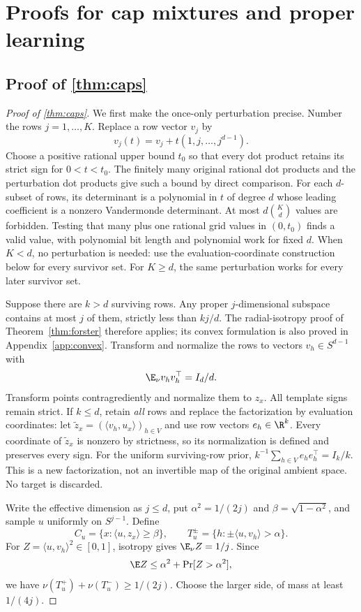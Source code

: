 \section{Proofs for cap mixtures and proper learning}\label{app:proofs-B}

\subsection[Proof of result caps]{Proof of \cref{thm:caps}}\label{proof:caps}
\begin{proof}[Proof of \cref{thm:caps}]
We first make the once-only perturbation precise. Number the rows $j=1,\ldots,K$. Replace a row vector $v_j$ by
\[
 v_j(t)=v_j+t(1,j,\ldots,j^{d-1}).
\]
Choose a positive rational upper bound $t_0$ so that every dot product retains its strict sign for $0<t<t_0$. The finitely many original rational dot products and the perturbation dot products give such a bound by direct comparison. For each $d$-subset of rows, its determinant is a polynomial in $t$ of degree $d$ whose leading coefficient is a nonzero Vandermonde determinant. At most $d\binom Kd$ values are forbidden. Testing that many plus one rational grid values in $(0,t_0)$ finds a valid value, with polynomial bit length and polynomial work for fixed $d$. When $K<d$, no perturbation is needed: use the evaluation-coordinate construction below for every survivor set. For $K\ge d$, the same perturbation works for every later survivor set.

Suppose there are $k>d$ surviving rows. Any proper $j$-dimensional subspace contains at most $j$ of them, strictly less than $kj/d$. The radial-isotropy proof of Theorem~\ref{thm:forster} therefore applies; its convex formulation is also proved in Appendix~\ref{app:convex}. Transform and normalize the rows to vectors $v_h\in S^{d-1}$ with
\[
 \E_\nu v_hv_h^\top=I_d/d.
\]
Transform points contragrediently and normalize them to $z_x$. All template signs remain strict. If $k\le d$, retain \emph{all} rows and replace the factorization by evaluation coordinates: let $\widetilde z_x=(\langle v_h,u_x\rangle)_{h\in V}$ and use row vectors $e_h\in\R^k$. Every coordinate of $\widetilde z_x$ is nonzero by strictness, so its normalization is defined and preserves every sign. For the uniform surviving-row prior, $k^{-1}\sum_{h\in V}e_he_h^\top=I_k/k$. This is a new factorization, not an invertible map of the original ambient space. No target is discarded.

Write the effective dimension as $j\le d$, put $\alpha^2=1/(2j)$ and $\beta=\sqrt{1-\alpha^2}$, and sample $u$ uniformly on $S^{j-1}$. Define
\[
 C_u=\{x:\langle u,z_x\rangle\ge\beta\},\qquad
 T_u^\pm=\{h:\pm\langle u,v_h\rangle>\alpha\}.
\]
For $Z=\langle u,v_h\rangle^2\in[0,1]$, isotropy gives $\E_\nu Z=1/j$. Since
\[
 \E Z\le\alpha^2+\Pr[Z>\alpha^2],
\]
we have $\nu(T_u^+)+\nu(T_u^-)\ge1/(2j)$. Choose the larger side, of mass at least $1/(4j)$.


\end{proof}
